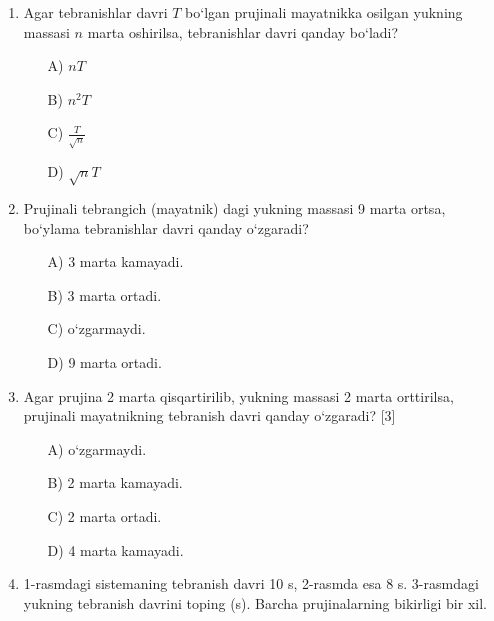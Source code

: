 \begin{enumerate}
\begin{itemize}
    \end{itemize}

    \item Agar tebranishlar davri $T$ bo‘lgan prujinali mayatnikka osilgan yukning massasi $n$ marta oshirilsa, tebranishlar davri qanday bo‘ladi?
    \begin{itemize}
        \item[A)] $nT$
        \item[B)] $n^2T$
        \item[C)] $\frac{T}{\sqrt{n}}$
        \item[D)] $\sqrt{n}T$
        
    \end{itemize}

    \item Prujinali tebrangich (mayatnik) dagi yukning massasi 9 marta ortsa, bo‘ylama tebranishlar davri qanday o‘zgaradi?
    \begin{itemize}
        \item[A)] 3 marta kamayadi.
        \item[B)] 3 marta ortadi.
        \item[C)] o‘zgarmaydi.
        \item[D)] 9 marta ortadi.
        
    \end{itemize}

    \item Agar prujina 2 marta qisqartirilib, yukning massasi 2 marta orttirilsa, prujinali mayatnikning tebranish davri qanday o‘zgaradi? [3]
    \begin{itemize}
        \item[A)] o‘zgarmaydi.
        \item[B)] 2 marta kamayadi.
        \item[C)] 2 marta ortadi.
        \item[D)] 4 marta kamayadi.
        
    \end{itemize}

    \item 1-rasmdagi sistemaning tebranish davri 10 s, 2-rasmda esa 8 s. 3-rasmdagi yukning tebranish davrini toping (s). Barcha prujinalarning bikirligi bir xil.

\end{enumerate}
